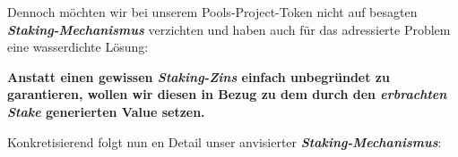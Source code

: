 \begin{Konzept}
\noindent\hrulefill

\vspace{0.5cm}

Dennoch möchten wir bei unserem Pools-Project-Token nicht auf besagten \textbf{\textit{Staking-Mechanismus}} verzichten und haben auch für das adressierte Problem eine wasser\-dichte Lösung:

\vspace{0.2cm}
 
\textbf{Anstatt einen gewissen \textit{Staking-Zins} einfach unbegründet zu garantieren, wollen wir diesen in Bezug zu dem durch den \textit{erbrachten Stake} generierten Value setzen.}

\vspace{0.5cm}

Konkretisierend folgt nun en Detail unser anvisierter \textbf{\textit{Staking-Mechanismus}}:


\end{Konzept}
